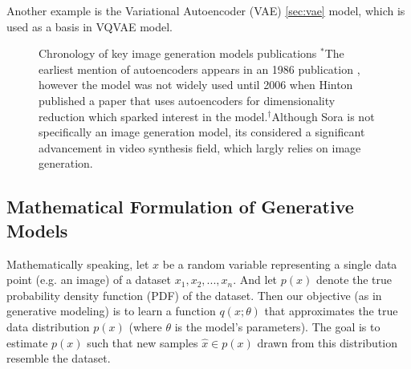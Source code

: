 Another example is the Variational Autoencoder (VAE) \cite{vae} \ref{sec:vae} model, which is used as a basis in VQVAE model. 

\begin{figure}[h!]
    \centering
    \caption{Chronology of key image generation models publications $^*$The earliest mention of autoencoders appears in an 1986 publication \cite{autoencoder_original_paper_1986}, however the model was not widely used until 2006 when Hinton published a paper that uses autoencoders for dimensionality reduction \cite{autoencoder_2006_paper} which sparked interest in the model.$^\dag$Although Sora \cite{sora_website} is not specifically an image generation model, its considered a significant advancement in video synthesis field, which largly relies on image generation.}
    \label{fig:models_timeline}
\end{figure}

\subsection{Mathematical Formulation of Generative Models}
Mathematically speaking, let $x$ be a random variable representing a single data point (e.g. an image) of a dataset ${x_1,x_2,...,x_n}$. And let $p(x)$ denote the true probability density function (PDF) of the dataset. Then our objective (as in generative modeling) is to learn a function $q(x;\theta)$ that approximates the true data distribution $p(x)$ (where $\theta$ is the model's parameters). The goal is to estimate $p(x)$ such that new samples $\hat{x} \in p(x)$ drawn from this distribution resemble the dataset.


